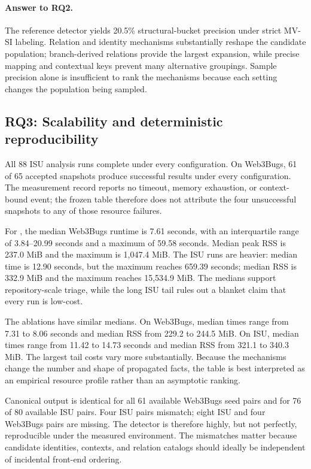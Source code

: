 \paragraph{Answer to RQ2.}
The reference detector yields 20.5\% structural-bucket precision under strict MV-SI labeling. Relation and identity mechanisms substantially reshape the candidate population; branch-derived relations provide the largest expansion, while precise mapping and contextual keys prevent many alternative groupings. Sample precision alone is insufficient to rank the mechanisms because each setting changes the population being sampled.

\subsection{RQ3: Scalability and deterministic reproducibility}
\label{s:results-scalability}



All 88 ISU analysis runs complete under every configuration. On Web3Bugs, 61 of 65 accepted snapshots produce successful results under every configuration. The measurement record reports no timeout, memory exhaustion, or context-bound event; the frozen table therefore does not attribute the four unsuccessful snapshots to any of those resource failures.

For , the median Web3Bugs runtime is 7.61 seconds, with an interquartile range of 3.84--20.99 seconds and a maximum of 59.58 seconds. Median peak RSS is 237.0 MiB and the maximum is 1,047.4 MiB. The ISU runs are heavier: median time is 12.90 seconds, but the maximum reaches 659.39 seconds; median RSS is 332.9 MiB and the maximum reaches 15,534.9 MiB. The medians support repository-scale triage, while the long ISU tail rules out a blanket claim that every run is low-cost.

The ablations have similar medians. On Web3Bugs, median times range from 7.31 to 8.06 seconds and median RSS from 229.2 to 244.5 MiB. On ISU, median times range from 11.42 to 14.73 seconds and median RSS from 321.1 to 340.3 MiB. The largest tail costs vary more substantially. Because the mechanisms change the number and shape of propagated facts, the table is best interpreted as an empirical resource profile rather than an asymptotic ranking.

Canonical output is identical for all 61 available Web3Bugs  seed pairs and for 76 of 80 available ISU pairs. Four ISU pairs mismatch; eight ISU and four Web3Bugs pairs are missing. The detector is therefore highly, but not perfectly, reproducible under the measured environment. The mismatches matter because candidate identities, contexts, and relation catalogs should ideally be independent of incidental front-end ordering.

